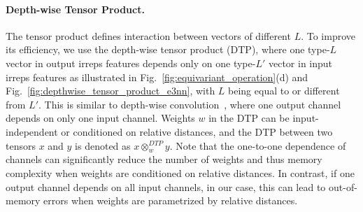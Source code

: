 \vspace{-2.5mm}
\paragraph{Depth-wise Tensor Product.}
The tensor product defines interaction between vectors of different $L$.
To improve its efficiency, we use the depth-wise tensor product (DTP), where one type-$L$ vector in output irreps features depends only on one type-$L'$ vector in input irreps features as illustrated in Fig.~\ref{fig:equivariant_operation}(d) and Fig.~\ref{fig:depthwise_tensor_product_e3nn}, with $L$ being equal to or different from $L'$.
This is similar to depth-wise convolution~\citep{mobilenet}, where one output channel depends on only one input channel. 
Weights $w$ in the DTP can be input-independent or conditioned on relative distances, and the DTP between two tensors $x$ and $y$ is denoted as $x \otimes_{w}^{DTP} y$. %
Note that the one-to-one dependence of channels can significantly reduce the number of weights and thus memory complexity when weights are conditioned on relative distances.
In contrast, if one output channel depends on all input channels, in our case, this can lead to out-of-memory errors when weights are parametrized by relative distances.

